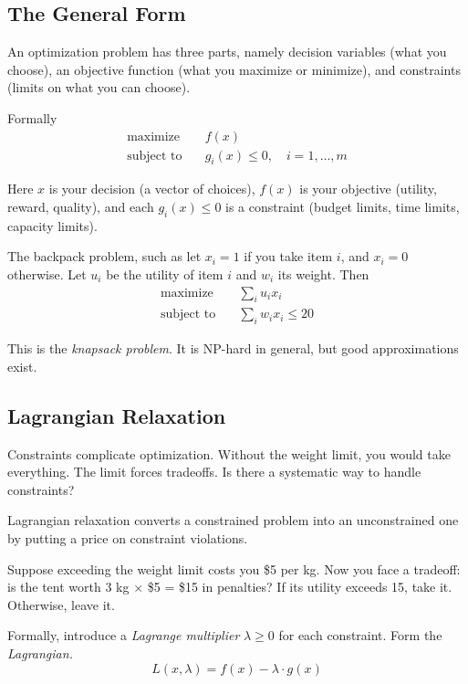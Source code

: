 \subsection{The General Form}

An optimization problem has three parts, namely decision variables (what you choose), an objective function (what you maximize or minimize), and constraints (limits on what you can choose).

Formally
\begin{align*}
\text{maximize} \quad & f(x) \\
\text{subject to} \quad & g_i(x) \leq 0, \quad i = 1, \ldots, m
\end{align*}

Here $x$ is your decision (a vector of choices), $f(x)$ is your objective (utility, reward, quality), and each $g_i(x) \leq 0$ is a constraint (budget limits, time limits, capacity limits).

The backpack problem, such as let $x_i = 1$ if you take item $i$, and $x_i = 0$ otherwise. Let $u_i$ be the utility of item $i$ and $w_i$ its weight. Then
\begin{align*}
\text{maximize} \quad & \sum_i u_i x_i \\
\text{subject to} \quad & \sum_i w_i x_i \leq 20
\end{align*}

This is the \textit{knapsack problem}. It is NP-hard in general, but good approximations exist.

\subsection{Lagrangian Relaxation}

Constraints complicate optimization. Without the weight limit, you would take everything. The limit forces tradeoffs. Is there a systematic way to handle constraints?

Lagrangian relaxation converts a constrained problem into an unconstrained one by putting a price on constraint violations.

Suppose exceeding the weight limit costs you \$5 per kg. Now you face a tradeoff: is the tent worth 3 kg $\times$ \$5 = \$15 in penalties? If its utility exceeds 15, take it. Otherwise, leave it.

Formally, introduce a \textit{Lagrange multiplier} $\lambda \geq 0$ for each constraint. Form the \textit{Lagrangian.}
\[
L(x, \lambda) = f(x) - \lambda \cdot g(x)
\]

